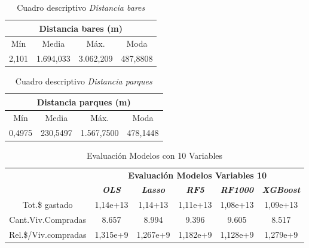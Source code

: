\documentclass[conference, 10pt]{IEEEtran}
\begin{document}
\begin{table}[htbp]
\caption{Cuadro descriptivo \textit{Distancia bares}}
\begin{center}
\begin{tabular}{|c|c|c|c|}
\hline
\multicolumn{4}{|c|}{\textbf{Distancia bares (m)}} \\
\cline{1-4} 
\hline
 Mín&Media&Máx.&Moda\\
\hline
 2,101&1.694,033&3.062,209&487,8808\\
 	\hline
\end{tabular}
\label{tab_9}
\end{center}
\end{table}

\begin{table}[htbp]
\caption{Cuadro descriptivo \textit{Distancia parques}}
\begin{center}
\begin{tabular}{|c|c|c|c|}
\hline
\multicolumn{4}{|c|}{\textbf{Distancia parques (m)}} \\
\cline{1-4} 
\hline
 Mín&Media&Máx.&Moda\\
\hline
 0,4975&230,5497&1.567,7500&478,1448\\
 	\hline
\end{tabular}
\label{tab_10}
\end{center}
\end{table}


\begin{table}[htbp]
\caption{Evaluación Modelos con 10 Variables}
\begin{center}
\begin{tabular}{|c|c|c|c|c|c|}
\hline
&\multicolumn{5}{|c|}{\textbf{Evaluación Modelos Variables 10}} \\
\cline{2-6} 
& \textbf{\textit{OLS}}& \textbf{\textit{Lasso}}& \textbf{\textit{RF5}}& \textbf{\textit{RF1000}}& \textbf{\textit{XGBoost}} \\
\hline
Tot.\$ gastado& 1,14e+13& 1,14+13& 1,11e+13& 1,08e+13& 1,09e+13 \\
\hline
Cant.Viv.Compradas& 8.657& 8.994& 9.396& 9.605& 8.517 \\
\hline
Rel.\$/Viv.compradas& 1,315e+9& 1,267e+9& 1,182e+9& 1,128e+9& 1,279e+9 \\

\hline
\end{tabular}
\label{tab_11}
\end{center}
\end{table}
\end{document}
